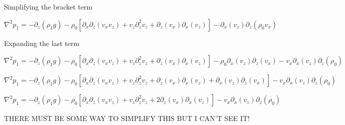 \documentclass{article}
\begin{document}
Simplifying the bracket term

\begin{equation}
    \nabla^2 p_1 = - \partial_z\left(\rho_1 g\right)
    -\rho_0\left[\partial_x\partial_z(v_x v_z)+v_z\partial^2_z v_z+\partial_z(v_x)\partial_x(v_z) \right]
    -\partial_x(v_z)\partial_z(\rho_0v_x)
\end{equation}

Expanding the last term

\begin{equation}
    \nabla^2 p_1 = - \partial_z\left(\rho_1 g\right)
    -\rho_0\left[\partial_x\partial_z(v_x v_z)+v_z\partial^2_z v_z+\partial_z(v_x)\partial_x(v_z) \right]
    -\rho_0\partial_x(v_z)\partial_z(v_x)-v_x \partial_x(v_z)\partial_z(\rho_0)
\end{equation}

\begin{equation}
    \nabla^2 p_1 = - \partial_z\left(\rho_1 g\right)
    -\rho_0\left[\partial_x\partial_z(v_x v_z)+v_z\partial^2_z v_z+\partial_z(v_x)\partial_x(v_z) +\partial_x(v_z)\partial_z(v_x)\right]
    -v_x \partial_x(v_z)\partial_z(\rho_0)
\end{equation}

\begin{equation}
    \nabla^2 p_1 = - \partial_z\left(\rho_1 g\right)
    -\rho_0\left[\partial_x\partial_z(v_x v_z)+v_z\partial^2_z v_z+2\partial_z(v_x)\partial_x(v_z)\right]
    -v_x \partial_x(v_z)\partial_z(\rho_0)
\end{equation}

THERE MUST BE SOME WAY TO SIMPLIFY THIS BUT I CAN'T SEE IT!





\end{document}
